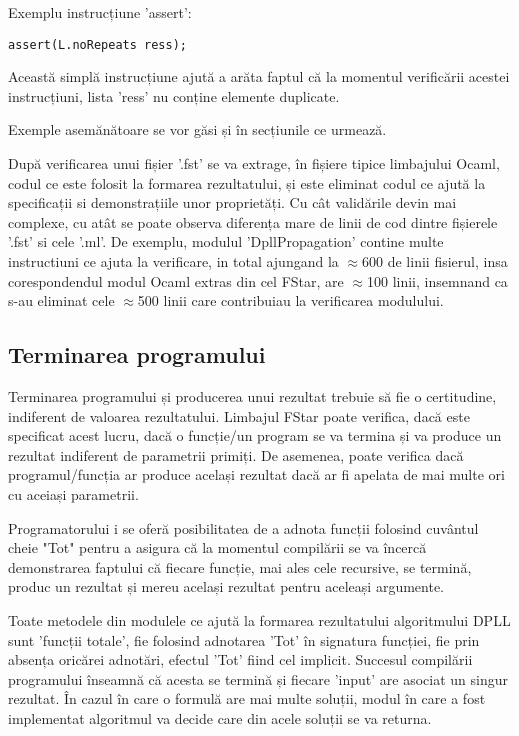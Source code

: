 Exemplu instrucțiune 'assert':
\begin{lstlisting}[]
assert(L.noRepeats ress);

\end{lstlisting}

Această simplă instrucțiune ajută a arăta faptul că la momentul verificării acestei instrucțiuni, lista 'ress' nu conține elemente duplicate.

Exemple asemănătoare se vor găsi și în secțiunile ce urmează.

După verificarea unui fișier '.fst' se va extrage, în fișiere tipice limbajului Ocaml, codul ce este folosit la formarea rezultatului, și este eliminat codul ce ajută la \newline specificații si demonstrațiile unor proprietăți. Cu cât validările devin mai complexe, cu atât se poate observa diferența mare de linii de cod dintre fișierele '.fst' si cele '.ml'.
De exemplu, modulul 'DpllPropagation' contine multe instructiuni ce ajuta la verificare, in total ajungand la $\approx$600 de linii fisierul, insa corespondendul modul Ocaml extras din cel FStar, are $\approx$100 linii, insemnand ca s-au eliminat cele $\approx$500 linii care contribuiau la verificarea modulului.

\subsection{Terminarea programului}

Terminarea programului și producerea unui rezultat trebuie să fie o certitudine, indiferent de valoarea rezultatului. Limbajul FStar poate verifica, dacă este specificat acest lucru, dacă o funcție/un program se va termina și va produce un rezultat indiferent de parametrii primiți. De asemenea, poate verifica dacă programul/funcția ar produce același rezultat dacă ar fi apelata de mai multe ori cu aceiași parametrii.

Programatorului i se oferă posibilitatea de a adnota funcții folosind cuvântul cheie "Tot" pentru a asigura că la momentul compilării se va încercă demonstrarea faptului că fiecare funcție, mai ales cele recursive, se termină, produc un rezultat și mereu același rezultat pentru aceleași argumente. 

\newpage

Toate metodele din modulele ce ajută la formarea rezultatului algoritmului DPLL sunt 'funcții totale', fie folosind adnotarea 'Tot' în signatura funcției, fie prin absența oricărei adnotări, efectul 'Tot' fiind cel implicit. Succesul compilării programului înseamnă că acesta se termină și fiecare 'input' are asociat un singur rezultat. În cazul în care o formulă are mai multe soluții, modul în care a fost implementat algoritmul va decide care din acele soluții se va returna.


